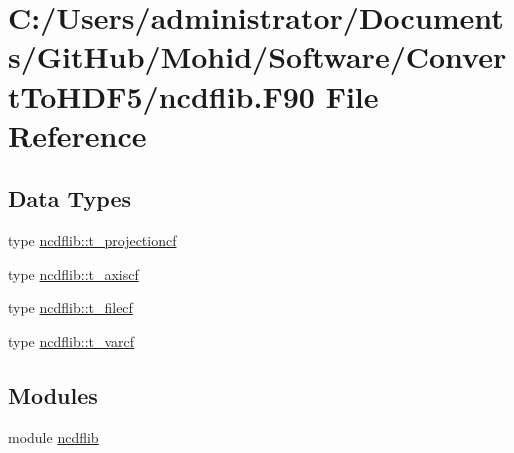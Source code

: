 \hypertarget{ncdflib_8_f90}{}\section{C\+:/\+Users/administrator/\+Documents/\+Git\+Hub/\+Mohid/\+Software/\+Convert\+To\+H\+D\+F5/ncdflib.F90 File Reference}
\label{ncdflib_8_f90}
\subsection*{Data Types}
\begin{DoxyCompactItemize}
\item 
type \mbox{\hyperlink{structncdflib_1_1t__projectioncf}{ncdflib\+::t\+\_\+projectioncf}}
\item 
type \mbox{\hyperlink{structncdflib_1_1t__axiscf}{ncdflib\+::t\+\_\+axiscf}}
\item 
type \mbox{\hyperlink{structncdflib_1_1t__filecf}{ncdflib\+::t\+\_\+filecf}}
\item 
type \mbox{\hyperlink{structncdflib_1_1t__varcf}{ncdflib\+::t\+\_\+varcf}}
\end{DoxyCompactItemize}
\subsection*{Modules}
\begin{DoxyCompactItemize}
\item 
module \mbox{\hyperlink{namespacencdflib}{ncdflib}}
\end{DoxyCompactItemize}
